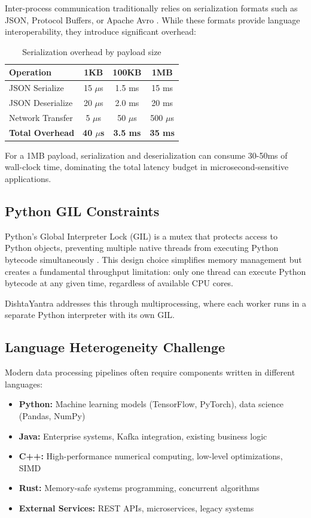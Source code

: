 \documentclass[11pt,a4paper]{article}
\begin{document}
Inter-process communication traditionally relies on serialization formats such as JSON, Protocol Buffers, or Apache Avro \cite{kleppmann2017designing}. While these formats provide language interoperability, they introduce significant overhead:

\begin{table}[H]
\centering
\caption{Serialization overhead by payload size}
\begin{tabular}{@{}lccc@{}}
\toprule
\textbf{Operation} & \textbf{1KB} & \textbf{100KB} & \textbf{1MB} \\
\midrule
JSON Serialize & 15 $\mu$s & 1.5 ms & 15 ms \\
JSON Deserialize & 20 $\mu$s & 2.0 ms & 20 ms \\
Network Transfer & 5 $\mu$s & 50 $\mu$s & 500 $\mu$s \\
\textbf{Total Overhead} & \textbf{40 $\mu$s} & \textbf{3.5 ms} & \textbf{35 ms} \\
\bottomrule
\end{tabular}
\end{table}

For a 1MB payload, serialization and deserialization can consume 30-50ms of wall-clock time, dominating the total latency budget in microsecond-sensitive applications.

\subsection{Python GIL Constraints}

Python's Global Interpreter Lock (GIL) is a mutex that protects access to Python objects, preventing multiple native threads from executing Python bytecode simultaneously \cite{beazley2010gil}. This design choice simplifies memory management but creates a fundamental throughput limitation: only one thread can execute Python bytecode at any given time, regardless of available CPU cores.

DishtaYantra addresses this through multiprocessing, where each worker runs in a separate Python interpreter with its own GIL.

\subsection{Language Heterogeneity Challenge}

Modern data processing pipelines often require components written in different languages:

\begin{itemize}
    \item \textbf{Python:} Machine learning models (TensorFlow, PyTorch), data science (Pandas, NumPy)
    \item \textbf{Java:} Enterprise systems, Kafka integration, existing business logic
    \item \textbf{C++:} High-performance numerical computing, low-level optimizations, SIMD
    \item \textbf{Rust:} Memory-safe systems programming, concurrent algorithms
    \item \textbf{External Services:} REST APIs, microservices, legacy systems
\end{itemize}
\end{document}
